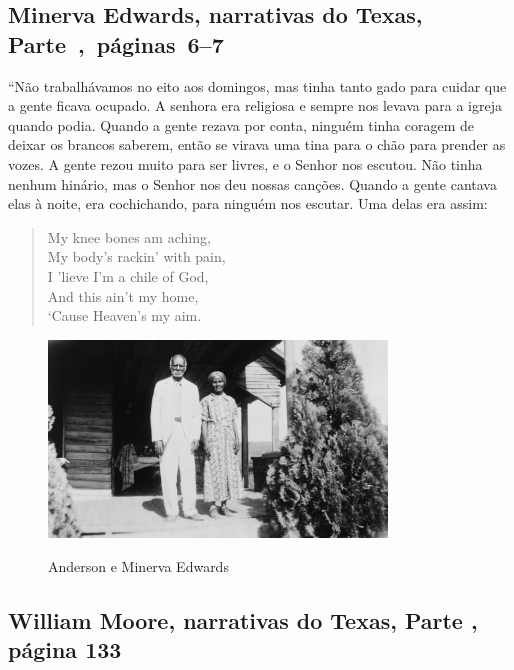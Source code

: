 \subsection{Minerva Edwards, narrativas do Texas, Parte~,~páginas~6--7} \label{ref82}

``Não trabalhávamos no eito aos domingos, mas tinha tanto gado para
cuidar que a gente ficava ocupado. A senhora era religiosa e sempre nos
levava para a igreja quando podia. Quando a gente rezava por conta,
ninguém tinha coragem de deixar os brancos saberem, então se virava uma
tina para o chão para prender as vozes. A gente rezou muito para ser
livres, e o Senhor nos escutou. Não tinha nenhum hinário, mas o Senhor
nos deu nossas canções. Quando a gente cantava elas à noite, era
cochichando, para ninguém nos escutar. Uma delas era assim:

\begin{verse}
My knee bones am aching,\\
My body's rackin' with pain,\\
I 'lieve I'm a chile of God,\\
And this ain't my home,\\
`Cause Heaven's my aim.\footnotemark
\end{verse}


\begin{figure}[!ht]
\centering
 \includegraphics[width=90mm]{./imgs/anderson_minervaedwards_recorte.jpg} \label{img16}
\caption{Anderson e Minerva Edwards}
\end{figure}

\subsection{William Moore, narrativas do Texas, Parte , página 133}
\label{ref197}

